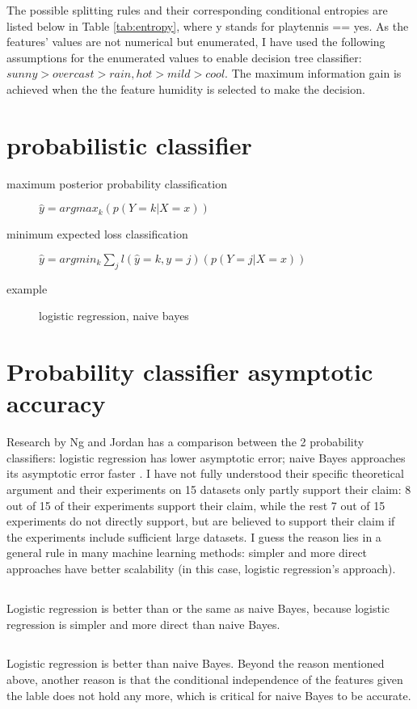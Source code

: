 \documentclass[12pt]{article}
\begin{document}
\begin{multicols}{2}
  The possible splitting rules and their corresponding conditional entropies are listed below in Table \ref{tab:entropy}, where y stands for playtennis == yes. As the features' values are not numerical but enumerated, I have used the following assumptions for the enumerated values to enable decision tree classifier: $sunny > overcast > rain, hot > mild > cool$. The maximum information gain is achieved when the the feature humidity is selected to make the decision.

  \section{probabilistic classifier}
  \begin{description}
    \item[maximum posterior probability classification] $\hat{y} = argmax_k(p(Y=k|X=x))$
    \item[minimum expected loss classification] $\hat{y} = argmin_k \sum_j l(\hat{y}=k,y=j)(p(Y=j|X=x))$
      \item[example] logistic regression, naive bayes
  \end{description}

  \section{Probability classifier asymptotic accuracy}
  Research by Ng and Jordan has a comparison between the 2 probability classifiers: logistic regression has lower asymptotic error; naive Bayes approaches its asymptotic error faster \cite{jordan2002discriminative}. I have not fully understood their specific theoretical argument and their experiments on 15 datasets only partly support their claim: 8 out of 15 of their experiments support their claim, while the rest 7 out of 15 experiments do not directly support, but are believed to support their claim if the experiments include sufficient large datasets. I guess the reason lies in a general rule in many machine learning methods: simpler and more direct approaches have better scalability (in this case, logistic regression's approach).
  \subsection{}
  Logistic regression is better than or the same as naive Bayes, because logistic regression is simpler and more direct than naive Bayes.
  \subsection{}
  Logistic regression is better than naive Bayes. Beyond the reason mentioned above, another reason is that the conditional independence of the features given the lable does not hold any more, which is critical for naive Bayes to be accurate.


\end{multicols}
\end{document}
